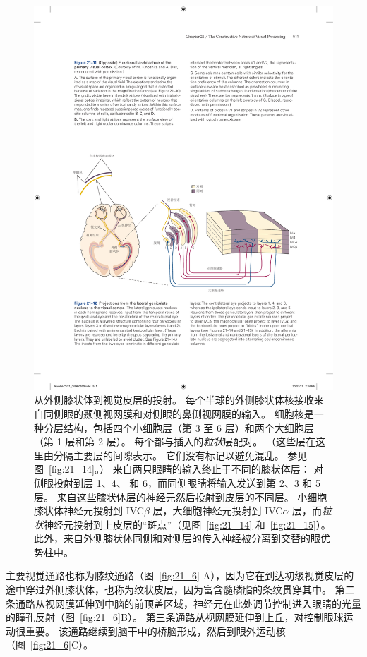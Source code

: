 \begin{figure}[htbp]
	\centering
	\includegraphics[width=1.0\linewidth]{chap21/fig_21_12}
	\caption{从外侧膝状体到视觉皮层的投射。
		每个半球的外侧膝状体核接收来自同侧眼的颞侧视网膜和对侧眼的鼻侧视网膜的输入。
		细胞核是一种分层结构，包括四个小细胞层（第 3 至 6 层）和两个大细胞层（第 1 层和第 2 层）。
		每个都与插入的\textit{粒状}层配对。
		（这些层在这里由分隔主要层的间隙表示。
		它们没有标记以避免混乱。
		参见图~\ref{fig:21_14}。）
		来自两只眼睛的输入终止于不同的膝状体层：
		对侧眼投射到层 1、4、 和 6，而同侧眼睛将输入发送到第 2、3 和 5 层。
		来自这些膝状体层的神经元然后投射到皮层的不同层。
		小细胞膝状体神经元投射到 IVC$\beta$ 层，大细胞神经元投射到 IVC$\alpha$ 层，而\textit{粒状}神经元投射到上皮层的“斑点”（见图~\ref{fig:21_14} 和~\ref{fig:21_15}）。
		此外，来自外侧膝状体同侧和对侧层的传入神经被分离到交替的眼优势柱中。}
	\label{fig:21_12}
\end{figure}


主要视觉通路也称为膝纹通路（图~\ref{fig:21_6} A），因为它在到达初级视觉皮层的途中穿过外侧膝状体，也称为纹状皮层，因为富含髓磷脂的条纹贯穿其中。
第二条通路从视网膜延伸到中脑的前顶盖区域，神经元在此处调节控制进入眼睛的光量的瞳孔反射（图~\ref{fig:21_6}B）。
第三条通路从视网膜延伸到上丘，对控制眼球运动很重要。
该通路继续到脑干中的桥脑形成，然后到眼外运动核（图~\ref{fig:21_6}C）。


